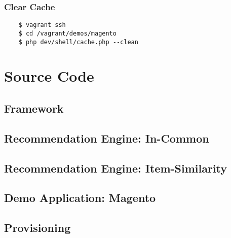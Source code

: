 \subsubsection{Clear Cache}

\begin{verbatim}
    $ vagrant ssh
    $ cd /vagrant/demos/magento
    $ php dev/shell/cache.php --clean
\end{verbatim}


\section{Source Code}

\setmonofont{Consolas}

\subsection{Framework}

% 

\subsection{Recommendation Engine: In-Common}

% 

\subsection{Recommendation Engine: Item-Similarity}

% 

\subsection{Demo Application: Magento}

% 

\subsection{Provisioning}

% 